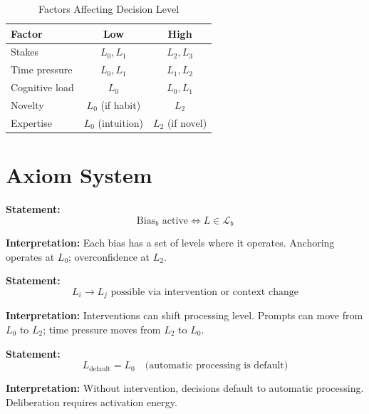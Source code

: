 \begin{table}[htbp]
\centering
\caption{Factors Affecting Decision Level}
\label{tab:hier-determinants}
\renewcommand{\arraystretch}{1.3}
\begin{tabular}{@{}lcc@{}}
\toprule
\textbf{Factor} & \textbf{Low} & \textbf{High} \\
\midrule
Stakes & $L_0, L_1$ & $L_2, L_3$ \\
Time pressure & $L_0, L_1$ & $L_1, L_2$ \\
Cognitive load & $L_0$ & $L_0, L_1$ \\
Novelty & $L_0$ (if habit) & $L_2$ \\
Expertise & $L_0$ (intuition) & $L_2$ (if novel) \\
\bottomrule
\end{tabular}
\end{table}

\section{Axiom System}
\label{sec:hier-axioms}

\begin{tcolorbox}[colback=gray!5!white, colframe=gray!75!black,
    title=Axiom UNMAPPED_HIE-1: Level-Bias Correspondence]
\textbf{Statement:}
\begin{equation}
\text{Bias}_b \text{ active} \Leftrightarrow L \in \mathcal{L}_b
\end{equation}

\textbf{Interpretation:} Each bias has a set of levels where it operates.
Anchoring operates at $L_0$; overconfidence at $L_2$.
\end{tcolorbox}

\begin{tcolorbox}[colback=gray!5!white, colframe=gray!75!black,
    title=Axiom UNMAPPED_HIE-2: Level Shifting]
\textbf{Statement:}
\begin{equation}
L_i \to L_j \text{ possible via intervention or context change}
\end{equation}

\textbf{Interpretation:} Interventions can shift processing level.
Prompts can move from $L_0$ to $L_2$; time pressure moves from $L_2$ to $L_0$.
\end{tcolorbox}

\begin{tcolorbox}[colback=gray!5!white, colframe=gray!75!black,
    title=Axiom UNMAPPED_HIE-3: Default Level]
\textbf{Statement:}
\begin{equation}
L_{\text{default}} = L_0 \quad \text{(automatic processing is default)}
\end{equation}

\textbf{Interpretation:} Without intervention, decisions default to automatic processing.
Deliberation requires activation energy.
\end{tcolorbox}

